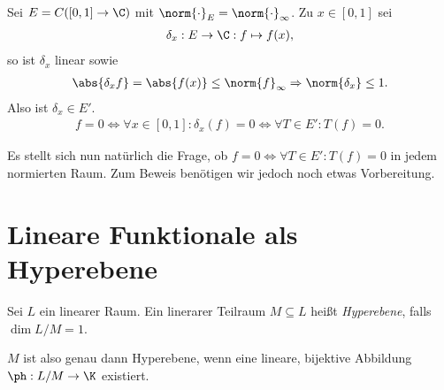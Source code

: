 \begin{bsp}
\label{bsp:4.2}
Sei $E=C([0,1]\to\C)$ mit $\norm{\cdot}_E=\norm{\cdot}_\infty$. Zu $x\in[0,1]$
sei 
\begin{align*}
\delta_x : E\to \C : f\mapsto f(x),
\end{align*}
so ist $\delta_x$ linear sowie
\begin{align*}
\abs{\delta_x f} = \abs{f(x)} \le \norm{f}_\infty \Rightarrow \norm{\delta_x}
\le 1.
\end{align*}
Also ist $\delta_x \in E'$.
\begin{align*}
f=0\Leftrightarrow \forall x\in[0,1] : \delta_x(f) = 0
\Leftrightarrow \forall T\in E' : T(f) = 0.
\end{align*}

Es stellt sich nun natürlich die Frage, ob $f=0\Leftrightarrow \forall T\in E'
: T(f) = 0$ in jedem normierten Raum. Zum Beweis benötigen wir jedoch noch
etwas Vorbereitung.\bsphere
\end{bsp}

\section{Lineare Funktionale als Hyperebene}

\begin{defn}
\label{defn:4.3}
Sei $L$ ein linearer Raum. Ein linerarer Teilraum $M\subseteq L$ heißt
\emph{Hyperebene}, falls $\dim L/M = 1$.\fishhere
\end{defn}

$M$ ist also genau dann Hyperebene, wenn eine lineare, bijektive Abbildung $\ph:
L/M\to \K$ existiert.

